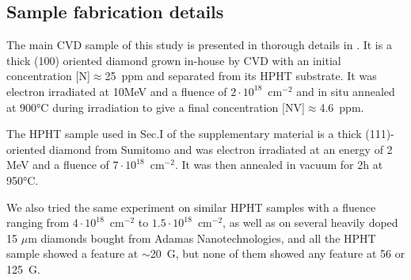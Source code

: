 \documentclass[9pt,twocolumn,twoside]{revtex4-1}
\begin{document}
\subsection{Sample fabrication details}
The main CVD sample of this study is presented in thorough details in \citep{TALLAIRE2020421}. It is a thick (100) oriented diamond grown in-house by CVD with an initial concentration [N]$\approx$25~ppm and separated from its HPHT substrate. It was electron irradiated at 10MeV and a fluence of $2\cdot 10^{18}$~cm$^{-2}$ and in situ annealed at 900°C during irradiation to give a final concentration [NV]$\approx$4.6~ppm.

The HPHT sample used in Sec.I of the supplementary material is a thick (111)-oriented diamond from Sumitomo and was electron irradiated at an energy of 2 MeV and a fluence of $7\cdot 10^{18}$~cm$^{-2}$. It was then annealed in vacuum for 2h at 950°C.

We also tried the same experiment on similar HPHT samples with a fluence ranging from $4\cdot 10^{18}$~cm$^{-2}$ to $1.5\cdot 10^{18}$~cm$^{-2}$, as well as on several heavily doped 15 $\mu$m diamonds bought from Adamas Nanotechnologies, and all the HPHT sample showed a feature at $\sim$20~G, but none of them showed any feature at 56 or 125~G.
\end{document}
